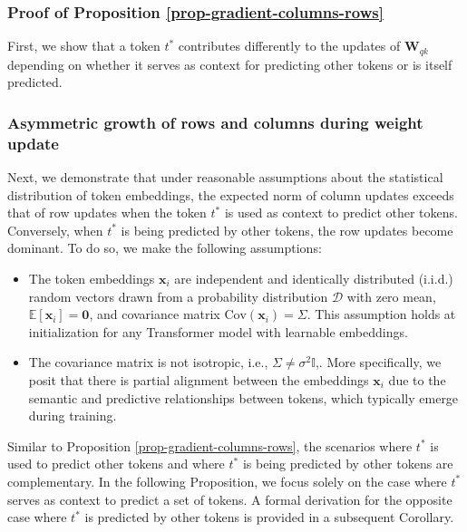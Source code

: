 %
%
\subsubsection{Proof of Proposition \ref{prop-gradient-columns-rows}}
\label{supp-math-prop-gradient-column-rows}
%
First, we show that a token $t^*$ contributes differently to the updates of $\bm{W}_{qk}$ depending on whether it serves as context for predicting other tokens or is itself predicted.
%

%

%





\subsubsection{Asymmetric growth of rows and columns during weight update}
\label{supp-math-prop-gradient-asymmetric-growth-rows-columns}
%
Next, we demonstrate that under reasonable assumptions about the statistical distribution of token embeddings, the expected norm of column updates exceeds that of row updates when the token \( t^* \) is used as context to predict other tokens.
%
Conversely, when $t^*$ is being predicted by other tokens, the row updates become dominant.
%
To do so, we make the following assumptions:
%
\begin{itemize}[noitemsep,nolistsep]
%
    \item The token embeddings $\bm{x}_i$ are independent and identically distributed (i.i.d.) random vectors drawn from a probability distribution $\mathcal{D}$ with zero mean, $\mathbb{E}[\bm{x}_i] = \mathbf{0}$, and covariance matrix $\text{Cov}(\bm{x}_i) = \Sigma$.
    This assumption holds at initialization for any Transformer model with learnable embeddings. 
    \item The covariance matrix is not isotropic, i.e., $\Sigma \neq \sigma^2 \mathbb{I}$,.
    More specifically, we posit that there is partial alignment between the embeddings $\bm{x}_i$ due to the semantic and predictive relationships between tokens, which typically emerge during training.
%
\end{itemize}
%
Similar to Proposition \ref{prop-gradient-columns-rows}, the scenarios where $t^*$ is used to predict other tokens and where $t^*$ is being predicted by other tokens are complementary. 
%
In the following Proposition, we focus solely on the case where $t^*$ serves as context to predict a set of tokens. 
%
A formal derivation for the opposite case where $t^*$ is predicted by other tokens is provided in a subsequent Corollary.

